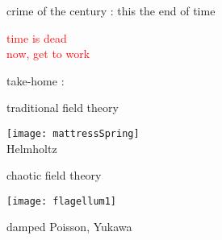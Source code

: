 \begin{frame}{crime of the century : this the end of time}
\begin{center}
\textcolor{red}{{\huge time is dead}
    \\
{now, get to work}}
\end{center}
\end{frame} %

\begin{frame}{take-home :   }
\begin{center}
            \begin{minipage}[c]{0.40\textwidth}\begin{center}
traditional field theory
\bigskip

\texttt{[image: mattressSpring]}\\
{\color{blue}Helmholtz}
            \end{center}\end{minipage}
            \hspace{2ex}
            \begin{minipage}[c]{0.46\textwidth}\begin{center}
chaotic field theory\\
\bigskip
\bigskip
\bigskip

\texttt{[image: flagellum1]}\\
\bigskip

damped {\color{blue}Poisson},  {\color{blue}Yukawa}
            \end{center}\end{minipage}
\end{center}
\end{frame} %


